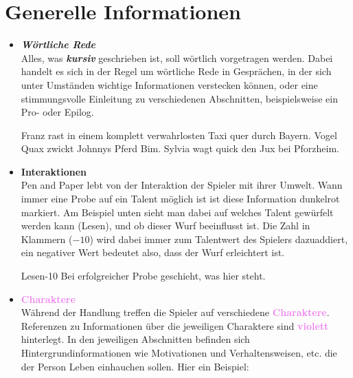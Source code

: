 
\thispagestyle{fancy-info}
\section*{Generelle Informationen}

\begin{itemize}
  \item \textbf{\textit{Wörtliche Rede}} \\
  Alles, was \textbf{\textit{kursiv}} geschrieben ist, soll wörtlich vorgetragen werden. Dabei handelt es sich in der Regel
  um wörtliche Rede in Gesprächen, in der sich unter Umständen wichtige Informationen verstecken können, oder eine
  stimmungsvolle Einleitung zu verschiedenen Abschnitten, beispielsweise ein Pro- oder Epilog.

  \begin{say}
  Franz rast in einem komplett verwahrlosten Taxi quer durch Bayern. Vogel Quax zwickt Johnnys Pferd Bim. Sylvia wagt quick den Jux bei Pforzheim.
  \end{say}

  \item \textcolor{RoyalRed}{\textbf{Interaktionen}} \\
  Pen and Paper lebt von der \textcolor{RoyalRed}{Interaktion} der Spieler mit ihrer Umwelt. Wann immer eine Probe auf ein Talent
  möglich ist ist diese Information \textcolor{RoyalRed}{dunkelrot} markiert. Am Beispiel unten sieht man dabei auf welches Talent
  gewürfelt werden kann (Lesen), und ob dieser Wurf beeinflusst ist. Die Zahl in Klammern ($-10$) wird dabei immer zum Talentwert
  des Spielers dazuaddiert, ein negativer Wert bedeutet also, dass der Wurf erleichtert ist.

  \begin{probe}{Lesen}{-10}
  Bei erfolgreicher Probe geschieht, was hier steht.
  \end{probe}
  \vspace{-5pt}

  \item \textcolor{violet}{\textbf{Charaktere}} \\
  Während der Handlung treffen die Spieler auf verschiedene \textcolor{violet}{\textbf{Charaktere}}. Referenzen zu Informationen über
  die jeweiligen Charaktere sind \textcolor{violet}{\textbf{violett}} hinterlegt. In den jeweiligen Abschnitten befinden sich
  Hintergrundinformationen wie Motivationen und Verhaltensweisen, etc. die der Person Leben einhauchen sollen. Hier ein
  Beispiel:


\end{itemize}
